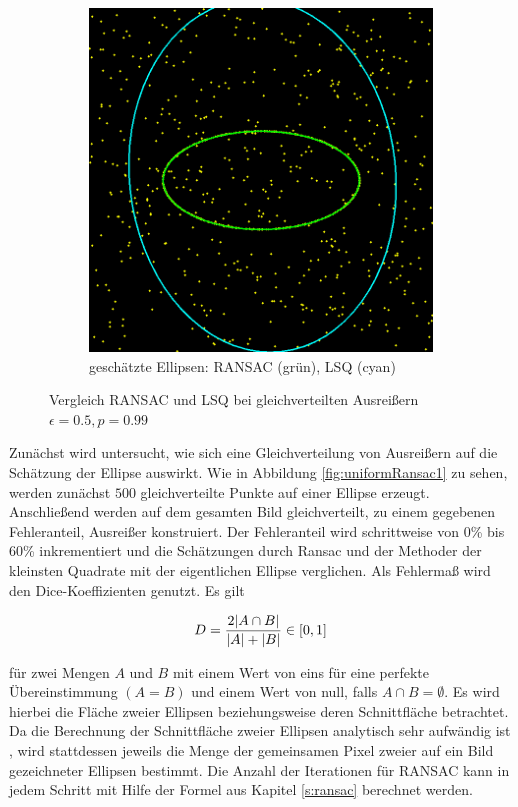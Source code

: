 {\begin{figure}[!htb]
\begin{subfigure}{.5\textwidth}
		\includegraphics[width=.9\textwidth]{images/ransac50_1.png}
		\caption{geschätzte Ellipsen: RANSAC (grün), LSQ (cyan)}
		\label{fig:uniformRansac2}
	\end{subfigure}
	\label{fig:uniformRansac}
	\caption{Vergleich RANSAC und LSQ bei gleichverteilten Ausreißern $\epsilon = 0.5, p = 0.99$}
\end{figure}

Zunächst wird untersucht, wie sich eine Gleichverteilung von Ausreißern auf die Schätzung der Ellipse auswirkt. Wie in Abbildung \ref{fig:uniformRansac1} zu sehen, werden zunächst $500$ gleichverteilte Punkte auf einer Ellipse erzeugt. 
Anschließend werden auf dem gesamten Bild gleichverteilt, zu einem gegebenen Fehleranteil, Ausreißer konstruiert. Der Fehleranteil wird schrittweise von 0\% bis 60\% inkrementiert und die Schätzungen durch Ransac und der Methoder der kleinsten Quadrate mit der eigentlichen Ellipse verglichen. Als Fehlermaß wird den Dice-Koeffizienten \cite{Dice1945} genutzt. Es gilt

\[
	D = \frac{2\lvert A\cap B\rvert}{\lvert A\rvert + \lvert B\rvert} \in [0, 1]
\]

für zwei Mengen $A$ und $B$ mit einem Wert von eins für eine perfekte Übereinstimmung $(A = B)$ und einem Wert von null, falls $A\cap B = \emptyset$. Es wird hierbei die Fläche zweier Ellipsen beziehungsweise deren Schnittfläche betrachtet. Da die Berechnung der Schnittfläche zweier Ellipsen analytisch sehr aufwändig ist \cite{Eberly2008}, wird stattdessen jeweils die Menge der gemeinsamen Pixel zweier auf ein Bild gezeichneter Ellipsen bestimmt.
Die Anzahl der Iterationen für RANSAC kann in jedem Schritt mit Hilfe der Formel aus Kapitel \ref{s:ransac} berechnet werden.

}
